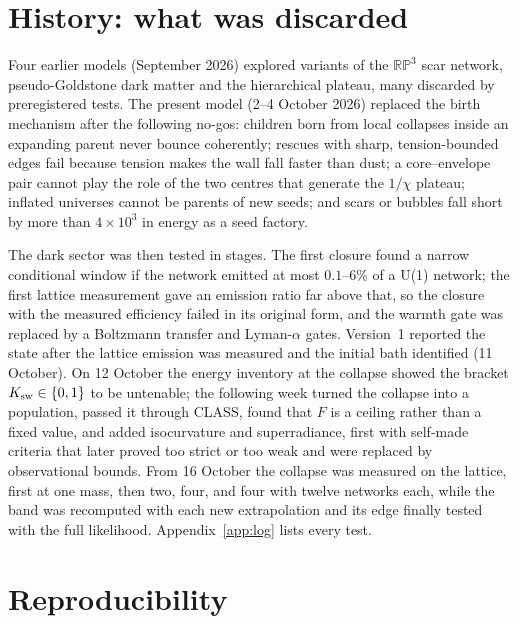 \documentclass[11pt,a4paper]{article}
\newcommand{\RP}{\mathbb{RP}^3}
\begin{document}
\section{History: what was discarded}
\label{sec:history}

Four earlier models (September 2026) explored variants of the $\RP$ scar network, pseudo-Goldstone dark matter and the hierarchical plateau, many discarded by preregistered tests.
The present model (2--4 October 2026) replaced the birth mechanism after the following no-gos:
children born from local collapses inside an expanding parent never bounce coherently;
rescues with sharp, tension-bounded edges fail because tension makes the wall fall faster than dust;
a core--envelope pair cannot play the role of the two centres that generate the $1/\chi$ plateau;
inflated universes cannot be parents of new seeds;
and scars or bubbles fall short by more than $4\times10^3$ in energy as a seed factory.

The dark sector was then tested in stages.
The first closure found a narrow conditional window if the network emitted at most $0.1$--$6\%$ of a U(1) network; the first lattice measurement gave an emission ratio far above that, so the closure with the measured efficiency failed in its original form, and the warmth gate was replaced by a Boltzmann transfer and Lyman-$\alpha$ gates.
Version~1 reported the state after the lattice emission was measured and the initial bath identified (11 October).
On 12 October the energy inventory at the collapse showed the bracket $K_{\rm sw}\in\{0,1\}$ to be untenable; the following week turned the collapse into a population, passed it through CLASS, found that $F$ is a ceiling rather than a fixed value, and added isocurvature and superradiance, first with self-made criteria that later proved too strict or too weak and were replaced by observational bounds.
From 16 October the collapse was measured on the lattice, first at one mass, then two, four, and four with twelve networks each, while the band was recomputed with each new extrapolation and its edge finally tested with the full likelihood.
Appendix~\ref{app:log} lists every test.

\section{Reproducibility}
\end{document}
